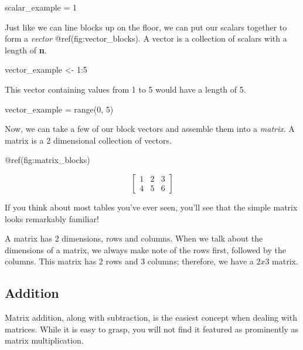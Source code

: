 \documentclass[
]{krantz}
\newenvironment{Shaded}{\begin{snugshade}}{\end{snugshade}}
\newcommand{\BuiltInTok}[1]{\textcolor[rgb]{0.00,0.23,0.31}{#1}}
\newcommand{\DecValTok}[1]{\textcolor[rgb]{0.68,0.00,0.00}{#1}}
\newcommand{\NormalTok}[1]{\textcolor[rgb]{0.00,0.23,0.31}{#1}}
\newcommand{\OperatorTok}[1]{\textcolor[rgb]{0.37,0.37,0.37}{#1}}
\newcommand{\OtherTok}[1]{\textcolor[rgb]{0.00,0.23,0.31}{#1}}
\newcommand{\SpecialCharTok}[1]{\textcolor[rgb]{0.37,0.37,0.37}{#1}}
\begin{document}
\begin{Shaded}
\begin{Highlighting}[]
\NormalTok{scalar\_example }\OperatorTok{=} \DecValTok{1}
\end{Highlighting}
\end{Shaded}

Just like we can line blocks up on the floor, we can put our scalars
together to form a \emph{vector} @ref(fig:vector\_blocks). A vector is a
collection of scalars with a length of \textbf{n}.

\begin{Shaded}
\begin{Highlighting}[]
\NormalTok{vector\_example }\OtherTok{\textless{}{-}} \DecValTok{1}\SpecialCharTok{:}\DecValTok{5}
\end{Highlighting}
\end{Shaded}

This vector containing values from 1 to 5 would have a length of 5.

\begin{Shaded}
\begin{Highlighting}[]
\NormalTok{vector\_example }\OperatorTok{=} \BuiltInTok{range}\NormalTok{(}\DecValTok{0}\NormalTok{, }\DecValTok{5}\NormalTok{)}
\end{Highlighting}
\end{Shaded}

Now, we can take a few of our block vectors and assemble them into a
\emph{matrix}. A matrix is a 2 dimensional collection of vectors.

@ref(fig:matrix\_blocks)

\[
\begin{bmatrix}
1 & 2 & 3\\
4 & 5 & 6
\end{bmatrix}
\]

If you think about most tables you've ever seen, you'll see that the
simple matrix looks remarkably familiar!

A matrix has 2 dimensions, rows and columns. When we talk about the
dimensions of a matrix, we always make note of the rows first, followed
by the columns. This matrix has 2 rows and 3 columns; therefore, we have
a \(2x3\) matrix.

\hypertarget{addition}{%
\subsection{Addition}\label{addition}}

Matrix addition, along with subtraction, is the easiest concept when
dealing with matrices. While it is easy to grasp, you will not find it
featured as prominently as matrix multiplication.
\end{document}
